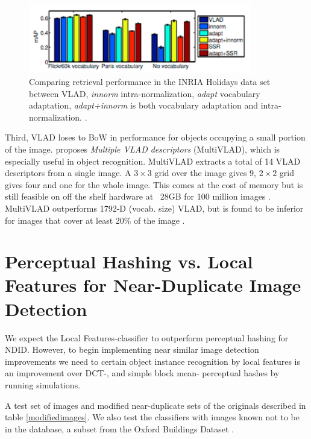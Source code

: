 \documentclass[english,12pt,a4paper,pdftex,elec,utf8, table]{aaltothesis}
\begin{document}
\begin{figure}[htb]
\begin{center}
\includegraphics[height=3cm]{figures/vladadapt}
\end{center}
\caption{Comparing retrieval performance in the INRIA Holidays data set between VLAD, \emph{innorm} intra-normalization, \emph{adapt} vocabulary adaptation, \emph{adapt+innorm} is both vocabulary adaptation and intra-normalization. \cite{Arandjelovic2013}.}
\label{vladadapt}
\end{figure}

Third, VLAD loses to BoW in performance for objects occupying a small portion of the image. \cite{Arandjelovic2013} proposes \emph{Multiple VLAD descriptors} (MultiVLAD), which is especially useful in object recognition. MultiVLAD extracts a total of 14 VLAD descriptors from a single image. A $3 \times 3$ grid over the image gives $9$, $2 \times 2$ grid gives four and one for the whole image. This comes at the cost of memory but is still feasible on off the shelf hardware at ~28GB for 100 million images \cite{Arandjelovic2013}. MultiVLAD outperforms 1792-D (vocab. size) VLAD, but is found to be inferior for images that cover at least 20\% of the image \cite{Arandjelovic2013}.

\clearpage

\section{Perceptual Hashing vs. Local Features for Near-Duplicate Image Detection} \label{mame}
We expect the Local Features-classifier to outperform perceptual hashing for NDID. However, to begin implementing near similar image detection improvements we need to certain object instance recognition by local features is an improvement over DCT-, and simple block mean- perceptual hashes by running simulations.

A test set of images and modified near-duplicate sets of the originals described in table \ref{modifiedimages}. We also test the classifiers with images known not to be in the database, a subset from the Oxford Buildings Dataset \cite{PhilbinJamesArandjelovicReljaZisserman2012}.
\end{document}
